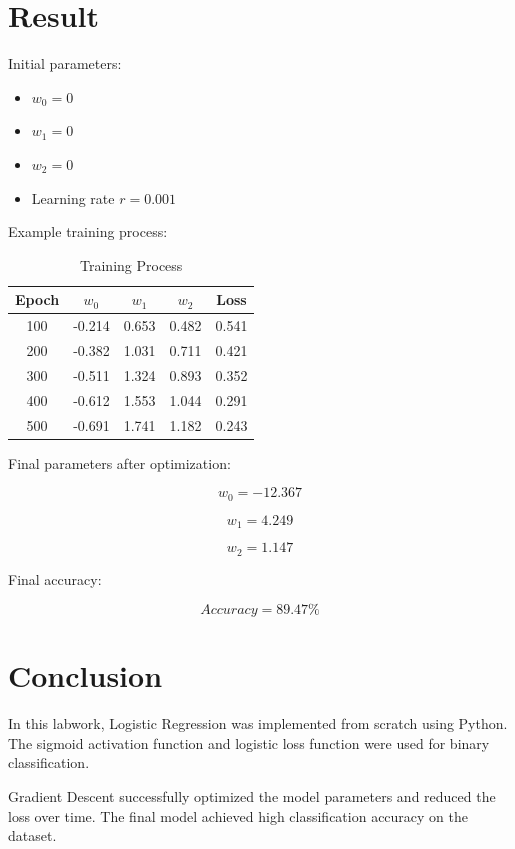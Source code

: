 \documentclass{article}
\begin{document}
\section{Result}

Initial parameters:

\begin{itemize}
    \item $w_0 = 0$
    \item $w_1 = 0$
    \item $w_2 = 0$
    \item Learning rate $r = 0.001$
\end{itemize}

Example training process:

\begin{table}[h!]
\centering
\caption{Training Process}
\begin{tabular}{|c|c|c|c|c|}
\hline
Epoch & $w_0$ & $w_1$ & $w_2$ & Loss \\ \hline
100 & -0.214 & 0.653 & 0.482 & 0.541 \\ \hline
200 & -0.382 & 1.031 & 0.711 & 0.421 \\ \hline
300 & -0.511 & 1.324 & 0.893 & 0.352 \\ \hline
400 & -0.612 & 1.553 & 1.044 & 0.291 \\ \hline
500 & -0.691 & 1.741 & 1.182 & 0.243 \\ \hline
\end{tabular}
\end{table}

Final parameters after optimization:

\[
w_0 = -12.367
\]

\[
w_1 = 4.249
\]

\[
w_2 = 1.147
\]

Final accuracy:

\[
Accuracy = 89.47\%
\]

\section{Conclusion}

In this labwork, Logistic Regression was implemented from scratch using Python. The sigmoid activation function and logistic loss function were used for binary classification.

Gradient Descent successfully optimized the model parameters and reduced the loss over time. The final model achieved high classification accuracy on the dataset.
\end{document}
